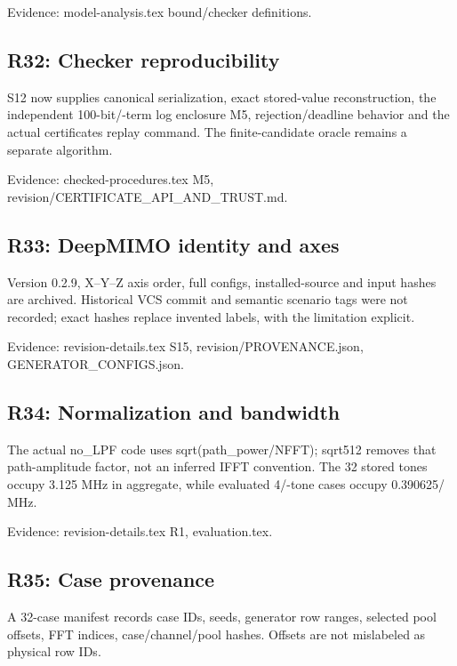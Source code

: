 \documentclass[10pt]{article}
\begin{document}
{\small Evidence: model-analysis.tex bound/\allowbreak checker definitions.}

\subsection*{R32: Checker reproducibility}

S12 now supplies canonical serialization, exact stored-value reconstruction, the independent 100-bit/-term log enclosure M5, rejection/\allowbreak deadline behavior and the actual certificates replay command. The finite-candidate oracle remains a separate algorithm.

{\small Evidence: checked-procedures.tex M5, revision/\allowbreak CERTIFICATE\_\allowbreak API\_\allowbreak AND\_\allowbreak TRUST.md.}

\subsection*{R33: DeepMIMO identity and axes}

Version 0.2.9, X--Y--Z axis order, full configs, installed-source and input hashes are archived. Historical VCS commit and semantic scenario tags were not recorded; exact hashes replace invented labels, with the limitation explicit.

{\small Evidence: revision-details.tex S15, revision/\allowbreak PROVENANCE.json, GENERATOR\_\allowbreak CONFIGS.json.}

\subsection*{R34: Normalization and bandwidth}

The actual no\_\allowbreak LPF code uses sqrt(path\_\allowbreak power/\allowbreak NFFT); sqrt512 removes that path-amplitude factor, not an inferred IFFT convention. The 32 stored tones occupy 3.125 MHz in aggregate, while evaluated 4/-tone cases occupy 0.390625/ MHz.

{\small Evidence: revision-details.tex R1, evaluation.tex.}

\subsection*{R35: Case provenance}

A 32-case manifest records case IDs, seeds, generator row ranges, selected pool offsets, FFT indices, case/\allowbreak channel/\allowbreak pool hashes. Offsets are not mislabeled as physical row IDs.
\end{document}

